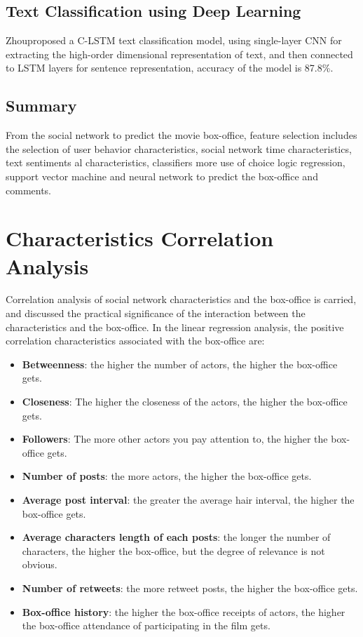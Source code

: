 \documentclass[review]{cvpr}
\begin{document}
\subsection{Text Classification using Deep Learning}

Zhou\etal proposed a C-LSTM text classification model, using single-layer CNN for extracting the high-order dimensional representation of text, and then connected to LSTM layers for sentence representation, accuracy of the model is 87.8\%.

\subsection{Summary}

From the social network to predict the movie box-office, feature selection includes the selection of user behavior characteristics, social network time characteristics, text sentiments al characteristics, classifiers more use of choice logic regression, support vector machine and neural network to predict the box-office and comments.


\section{Characteristics Correlation Analysis}

Correlation analysis of social network characteristics and the box-office is carried,
and discussed the practical significance of the interaction between the characteristics and the box-office.
In the linear regression analysis, the positive correlation characteristics associated with the box-office are:
\begin{itemize}
\item {\bf Betweenness}: the higher the number of actors, the higher the box-office gets.
\item {\bf Closeness}: The higher the closeness of the actors, the higher the box-office gets.
\item {\bf Followers}: The more other actors you pay attention to, the higher the box-office gets.
\item {\bf Number of posts}: the more actors, the higher the box-office gets.
\item {\bf Average post interval}: the greater the average hair interval, the higher the box-office gets.
\item {\bf Average characters length of each posts}: the longer the number of characters, the higher the box-office, but the degree of relevance is not obvious.
\item {\bf Number of retweets}: the more retweet posts, the higher the box-office gets.
\item {\bf Box-office history}: the higher the box-office receipts of actors, the higher the box-office attendance of participating in the film gets.
\end{itemize}
\end{document}
